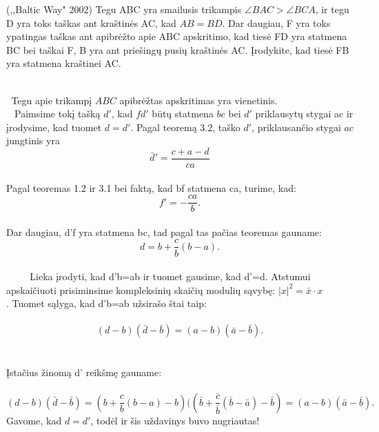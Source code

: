 \begin{pavnr}
(,,Baltic Way" 2002) Tegu ABC yra smailusis trikampis $ \angle BAC > \angle BCA$,
ir tegu D yra toks taškas ant kraštinės AC, kad $AB = BD$. Dar daugiau, F
yra toks ypatingas taškas ant apibrėžto apie ABC apskritimo, kad
tiesė FD yra statmena BC bei taškai
F, B yra ant priešingų pusių kraštinės AC. Įrodykite, kad tiesė FB yra statmena
kraštinei AC.
\end{pavnr}
\begin{sprendimas}
\\   $\phantom{a}$Tegu apie trikampį $ABC$ apibrėžtas apskritimas yra vienetinis. 
\\   $\phantom{a}$ Paimsime tokį tašką $d'$, kad $fd'$ būtų statmena $bc$ bei $d'$ priklausytų
 stygai ac ir įrodysime, kad tuomet $d=d'$. 
Pagal teoremą 3.2, taško $d'$, priklausančio stygai $ac$ jungtinis yra
\\ $$\bar d' = \frac {c+a-d}{ca}$$
\\Pagal teoremas
1.2 ir 3.1 bei faktą, kad bf statmena ca, turime, kad:
\\ $$ f'= - \frac {ca}{b}.$$
\\ Dar daugiau, d'f yra statmena bc, tad pagal tas pačias teoremas gauname:
$$ d= b+ \frac {c}{b}(b-a).$$
\\ $\phantom{aaaa}$ Lieka įrodyti, kad d'b=ab ir tuomet gausime, kad 
d'=d. Atstumui apskaičiuoti prisiminsime kompleksinių skaičių modulių sąvybę:
$ |x|^2=\bar x \cdot x$\\. Tuomet sąlyga, kad d'b=ab užsirašo štai taip:
\\
\\  $$ (d-b)( \bar d - \bar b)=(a-b)( \bar a - \bar b).$$
\\
\\ Įstačius žinomą d' reikšmę gauname:
\\
\\ $$ (d-b)( \bar d - \bar b)=( b+ \frac {c}{b}(b-a)-b)(( \bar b+ \frac {\bar c}{\bar b}(\bar b-\bar a)-\bar b)=(a-b)( \bar a - \bar b).$$
Gavome, kad $d=d'$, todėl ir šis uždavinys buvo nugriautas!
\end{sprendimas}

